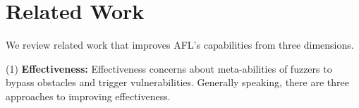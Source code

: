
\section{Related Work}\label{relatedwork}

We review related work that improves AFL's capabilities from three dimensions.

(1) \textbf{Effectiveness:} Effectiveness concerns about meta-abilities of fuzzers to bypass obstacles and trigger vulnerabilities. Generally speaking, there are three approaches to improving effectiveness. %


